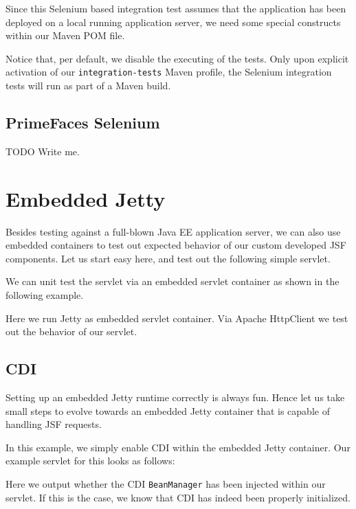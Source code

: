 Since this Selenium based integration test assumes that the application has been deployed on a local running application server, we need some special constructs within our Maven POM file.

Notice that, per default, we disable the executing of the tests.
Only upon explicit activation of our \texttt{integration-tests} Maven profile,
the Selenium integration tests will run as part of a Maven build.

\subsection{PrimeFaces Selenium}
\begin{TODO}{TODO}
	Write me.
\end{TODO}

\section{Embedded Jetty}
Besides testing against a full-blown Java EE application server, we can also use embedded containers to test out expected behavior of our custom developed JSF components.
Let us start easy here, and test out the following simple servlet.


We can unit test the servlet via an embedded servlet container as shown in the following example.

Here we run Jetty \cite{jetty} as embedded servlet container.
Via Apache HttpClient \cite{httpclient} we test out the behavior of our servlet.

\subsection{CDI}
Setting up an embedded Jetty runtime correctly is always fun.
Hence let us take small steps to evolve towards an embedded Jetty container that is capable of handling JSF requests.

In this example, we simply enable CDI within the embedded Jetty container.
Our example servlet for this looks as follows:

Here we output whether the CDI \texttt{BeanManager} has been injected within our servlet.
If this is the case, we know that CDI has indeed been properly initialized.

